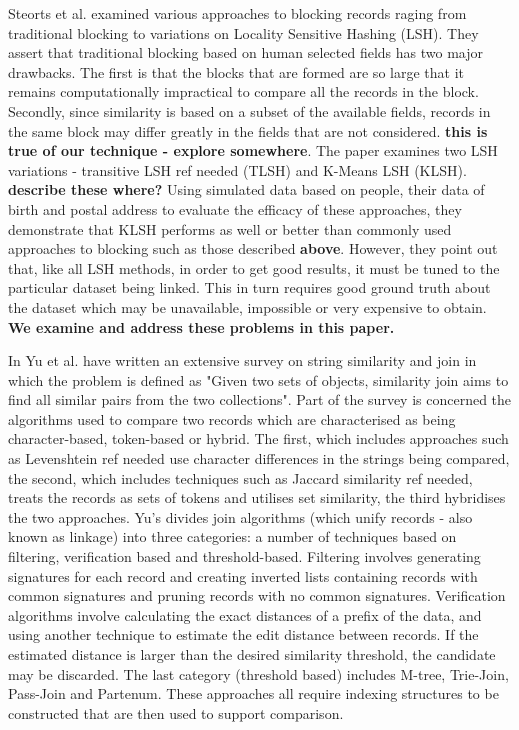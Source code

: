 \documentclass{llncs}
\begin{document}
Steorts et al. \cite{Steorts2014} examined various approaches to blocking records raging from traditional blocking to variations on Locality Sensitive Hashing (LSH). They assert that traditional blocking based on human selected fields has two major drawbacks. The first is that the blocks that are formed are so large that it remains computationally impractical to compare all the records in the block. Secondly, since similarity is based on a subset of the available fields, records in the same block may differ greatly in the fields that are not considered. \textbf{{this is true of our technique - explore somewhere}}. The paper examines two LSH variations - transitive LSH {ref needed} (TLSH) and K-Means LSH (KLSH). {\textbf{describe these where?}} 
Using simulated data based on people, their data of birth and postal address to evaluate the efficacy of these approaches, they demonstrate that KLSH performs as well or better than commonly used approaches to blocking such as those described \textbf{above}. However, they point out that, like all LSH methods, in order to get good results, it must be tuned to the particular dataset being linked. This in turn requires good ground truth about the dataset which may be unavailable, impossible or very expensive to obtain. \textbf{We examine and address these problems in this paper.}

In \cite{Yu2016} Yu et al. have written an extensive survey on string similarity and join in which the problem is defined as "Given two sets of objects, similarity join aims to find all similar pairs from the two collections". Part of the survey is concerned the  algorithms used to compare two records which are characterised as being character-based, token-based or hybrid. The first, which includes approaches such as Levenshtein {ref needed} use character differences in the strings being compared, the second, which includes techniques such as Jaccard similarity {ref needed}, treats the records as sets of tokens and utilises set similarity, the third hybridises the two approaches. Yu's divides join algorithms (which unify records - also known as linkage) into three categories: a number of techniques based on filtering, verification based and threshold-based. Filtering involves generating signatures for each record and creating inverted lists containing records with common signatures and pruning records with no common signatures. Verification algorithms involve calculating the exact distances of a prefix of the data, and using another technique to estimate the edit distance between records. If the estimated distance is larger than the desired similarity threshold, the candidate may be discarded. The last category (threshold based) includes M-tree, Trie-Join, Pass-Join and Partenum. These approaches all require indexing structures to be constructed that are then used to support comparison.  
\end{document}
